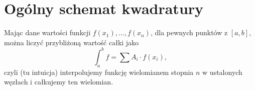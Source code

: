 \section{Ogólny schemat kwadratury}
Mając dane wartości funkcji \( f(x_1), \dots, f(x_n) \), dla pewnych punktów z \( [a, b] \), można liczyć przybliżoną wartość całki jako
\[
    \int_{a}^{b} f = \sum A_i \cdot f(x_i),
\]
czyli (tu intuicja) interpolujemy funkcję wielomianem stopnia \( n \) w ustalonych węzłach i całkujemy ten wielomian.
